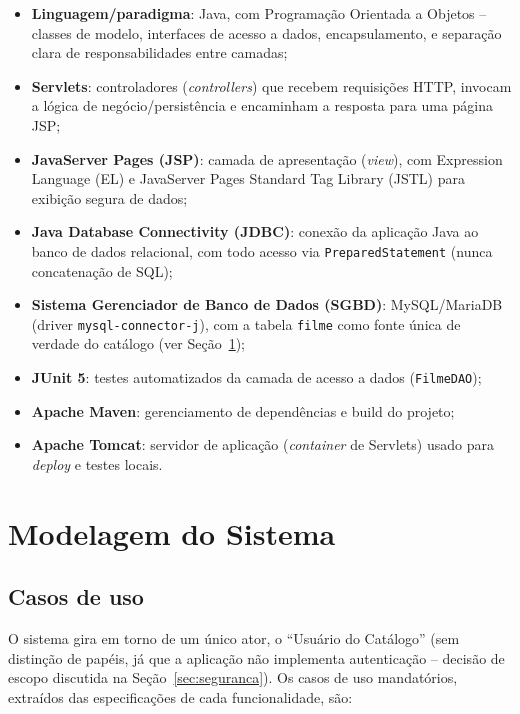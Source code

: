 \documentclass[12pt,a4paper]{article}
\begin{document}
\begin{itemize}
    \item \textbf{Linguagem/paradigma}: Java, com Programação Orientada a Objetos -- classes de
        modelo, interfaces de acesso a dados, encapsulamento, e separação clara de
        responsabilidades entre camadas;
    \item \textbf{Servlets}: controladores (\textit{controllers}) que recebem requisições HTTP,
        invocam a lógica de negócio/persistência e encaminham a resposta para uma página JSP;
    \item \textbf{JavaServer Pages (JSP)}: camada de apresentação (\textit{view}), com Expression
        Language (EL) e JavaServer Pages Standard Tag Library (JSTL) para exibição segura de
        dados;
    \item \textbf{Java Database Connectivity (JDBC)}: conexão da aplicação Java ao banco de
        dados relacional, com todo acesso via \texttt{PreparedStatement} (nunca concatenação de
        SQL);
    \item \textbf{Sistema Gerenciador de Banco de Dados (SGBD)}: MySQL/MariaDB (driver
        \texttt{mysql-connector-j}), com a tabela \texttt{filme} como fonte única de verdade do
        catálogo (ver Seção~\ref{sec:modelagem});
    \item \textbf{JUnit 5}: testes automatizados da camada de acesso a dados (\texttt{FilmeDAO});
    \item \textbf{Apache Maven}: gerenciamento de dependências e build do projeto;
    \item \textbf{Apache Tomcat}: servidor de aplicação (\textit{container} de Servlets) usado
        para \textit{deploy} e testes locais.
\end{itemize}

\section{Modelagem do Sistema}
\label{sec:modelagem}

\subsection{Casos de uso}

O sistema gira em torno de um único ator, o ``Usuário do Catálogo'' (sem distinção de papéis,
já que a aplicação não implementa autenticação -- decisão de escopo discutida na
Seção~\ref{sec:seguranca}). Os casos de uso mandatórios, extraídos das especificações de cada
funcionalidade, são:
\end{document}
